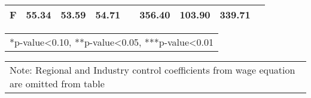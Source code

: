 \documentclass[12pt]{report}
\begin{document}
\begin{sidewaystable}
\begin{tabular}{lc|c|c|c|c|c|c|c}
F & 55.34 & 53.59 & 54.71 & & 356.40 & 103.90 & 339.71 & \\
\hline
\hline
\end{tabular}
\begin{tabular}{p{6.25in}}\footnotesize{
*p-value<0.10, **p-value<0.05, ***p-value<0.01}\\
\end{tabular}
\begin{tabular}{p{6.25in}}\footnotesize{
Note: Regional and Industry control coefficients from wage equation are omitted from table}\\
\end{tabular}
\end{sidewaystable}

\begin{comment}R-sq & 0.2376 & -0.0257 & -0.1256 & -0.1231 & 0.4028 & -0.5831 & -0.8851 & -0.8663\\
\end{comment}


\newpage
\end{document}
